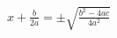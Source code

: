 \documentclass[preview]{standalone}
\begin{document}
\begin{align*}
x + \frac{b}{2a} = \pm\sqrt{\frac{b^2 - 4ac}{4a^2}}
\end{align*}
\end{document}
